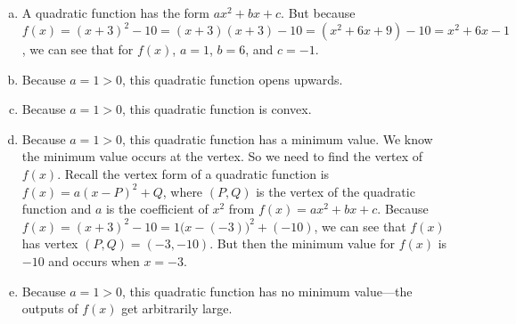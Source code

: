 \documentclass[11pt,letterpaper]{article}
\begin{document}
\sol 
\begin{enumerate}[(a)]
\item A quadratic function has the form $ax^2 + bx + c$. But because $f(x)= (x + 3)^2 - 10= (x + 3)(x + 3) - 10= (x^2 + 6x + 9) - 10= x^2 + 6x - 1$, we can see that for $f(x)$, $a= 1$, $b= 6$, and $c= -1$. \pspace

\item Because $a= 1 > 0$, this quadratic function opens upwards. \pspace

\item Because $a= 1 > 0$, this quadratic function is convex. \pspace

\item Because $a= 1 > 0$, this quadratic function has a minimum value. We know the minimum value occurs at the vertex. So we need to find the vertex of $f(x)$. Recall the vertex form of a quadratic function is $f(x)= a(x - P)^2 + Q$, where $(P, Q)$ is the vertex of the quadratic function and $a$ is the coefficient of $x^2$ from $f(x)= ax^2 + bx + c$. Because $f(x)= (x + 3)^2 - 10= 1 \big(x - (-3) \big)^2 + (-10)$, we can see that $f(x)$ has vertex $(P, Q)= (-3, -10)$. But then the minimum value for $f(x)$ is $-10$ and occurs when $x= -3$. \pspace

\item Because $a= 1 > 0$, this quadratic function has no minimum value---the outputs of $f(x)$ get arbitrarily large. 
\end{enumerate}
\end{document}
